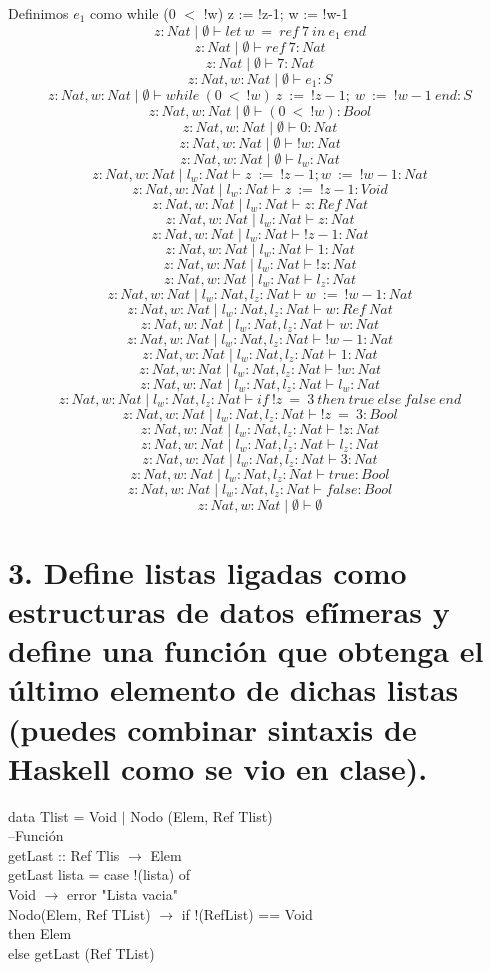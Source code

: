 \documentclass[11pt, a4paper]{report}
\begin{document}
\begin{itemize}
		Definimos $e_{1}$ como while (0 $<$ !w) z := !z-1; w := !w-1
		$$ z:Nat\mid \emptyset \vdash let\ w\ =\ ref\ 7\ in\ e_{1}\ end $$
		$$ z:Nat\mid \emptyset \vdash ref\ 7:Nat $$
		$$ z:Nat\mid \emptyset \vdash 7:Nat $$
		$$ z:Nat,w:Nat\mid \emptyset \vdash e_{1}:S $$
		$$ z:Nat,w:Nat\mid \emptyset \vdash while\ (0\ <\ !w)\ z\ :=\ !z-1;\ w\ :=\ !w-1\ end:S $$
		$$ z:Nat,w:Nat\mid \emptyset \vdash (0\ <\ !w):Bool $$
		$$ z:Nat,w:Nat\mid \emptyset \vdash 0:Nat $$
		$$ z:Nat,w:Nat\mid \emptyset \vdash !w:Nat $$
		$$ z:Nat,w:Nat\mid \emptyset \vdash l_{w}:Nat $$
		$$ z:Nat,w:Nat\mid l_{w}:Nat \vdash z\ :=\ !z-1;w\ :=\ !w-1:Nat $$
		$$ z:Nat,w:Nat\mid l_{w}:Nat \vdash z\ :=\ !z-1:Void $$
		$$ z:Nat,w:Nat\mid l_{w}:Nat \vdash z:Ref\ Nat $$
		$$ z:Nat,w:Nat\mid l_{w}:Nat \vdash z:Nat$$
		$$ z:Nat,w:Nat\mid l_{w}:Nat \vdash !z-1:Nat$$
		$$ z:Nat,w:Nat\mid l_{w}:Nat \vdash 1:Nat $$
		$$ z:Nat,w:Nat\mid l_{w}:Nat \vdash !z:Nat $$
		$$ z:Nat,w:Nat\mid l_{w}:Nat \vdash l_{z}:Nat $$
		$$ z:Nat,w:Nat\mid l_{w}:Nat,l_{z}:Nat \vdash w\ :=\ !w-1:Nat $$
		$$ z:Nat,w:Nat\mid l_{w}:Nat,l_{z}:Nat \vdash w:Ref\ Nat $$
		$$ z:Nat,w:Nat\mid l_{w}:Nat,l_{z}:Nat \vdash w:Nat$$
		$$ z:Nat,w:Nat\mid l_{w}:Nat,l_{z}:Nat \vdash !w-1:Nat$$
		$$ z:Nat,w:Nat\mid l_{w}:Nat,l_{z}:Nat \vdash 1:Nat$$
		$$ z:Nat,w:Nat\mid l_{w}:Nat,l_{z}:Nat \vdash !w:Nat$$
		$$ z:Nat,w:Nat\mid l_{w}:Nat,l_{z}:Nat \vdash l_{w}:Nat $$
		$$ z:Nat,w:Nat\mid l_{w}:Nat,l_{z}:Nat \vdash if\ !z\ =\ 3\ then\ true\ else\ false\ end$$
		$$ z:Nat,w:Nat\mid l_{w}:Nat,l_{z}:Nat \vdash !z\ =\ 3:Bool $$
		$$ z:Nat,w:Nat\mid l_{w}:Nat,l_{z}:Nat \vdash !z:Nat $$
		$$ z:Nat,w:Nat\mid l_{w}:Nat,l_{z}:Nat \vdash l_{z}:Nat $$
		$$ z:Nat,w:Nat\mid l_{w}:Nat,l_{z}:Nat \vdash 3:Nat $$
		$$ z:Nat,w:Nat\mid l_{w}:Nat,l_{z}:Nat \vdash true:Bool $$
		$$ z:Nat,w:Nat\mid l_{w}:Nat,l_{z}:Nat \vdash false:Bool $$
		$$ z:Nat,w:Nat\mid \emptyset \vdash \emptyset $$
\end{itemize}	
\section*{3. Define listas ligadas como estructuras de datos efímeras y define una función que obtenga el último elemento de dichas listas (puedes combinar sintaxis de Haskell como se vio en clase).}

data Tlist = Void $|$ Nodo (Elem, Ref Tlist) \\

--Funci\'on \\
getLast :: Ref Tlis $\rightarrow$  Elem     \\
getLast lista = case !(lista) of \\
										Void $\rightarrow$ error "Lista vacia" \\
										Nodo(Elem, Ref TList) $\rightarrow $ if   !(RefList) == Void \\
															 														  then  Elem \\
																													  else  getLast (Ref TList) 
\end{document}
